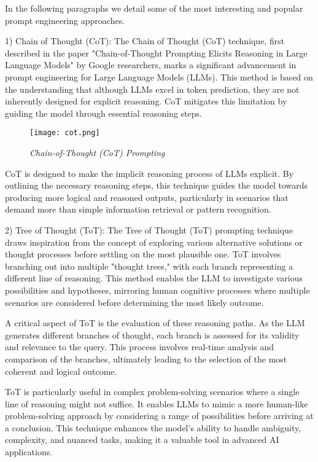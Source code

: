 In the following paragraphs we detail some of the most
interesting and popular prompt engineering approaches.

\hfill

1) Chain of Thought (CoT): The Chain of Thought (CoT) technique, first described in the paper "Chain-of-Thought Prompting Elicits Reasoning in Large Language Models" \cite{wei2023chainofthought} by Google researchers, marks a significant advancement in prompt engineering for Large Language Models (LLMs). This method is based on the understanding that although LLMs excel in token prediction, they are not inherently designed for explicit reasoning. CoT mitigates this limitation by guiding the model through essential reasoning steps.

\begin{figure}[H]
    \centering
    \texttt{[image: cot.png]}
    \caption{
        \it{Chain-of-Thought (CoT) Prompting \cite{wei2023chainofthought}}
    }
\end{figure}

CoT is designed to make the implicit reasoning process of LLMs explicit. By outlining the necessary reasoning steps, this technique guides the model towards producing more logical and reasoned outputs, particularly in scenarios that demand more than simple information retrieval or pattern recognition.

\hfill

2) Tree of Thought (ToT): The Tree of Thought (ToT) prompting technique \cite{yao2023tree} draws inspiration from the concept of exploring various alternative solutions or thought processes before settling on the most plausible one. ToT involves branching out into multiple "thought trees," with each branch representing a different line of reasoning. This method enables the LLM to investigate various possibilities and hypotheses, mirroring human cognitive processes where multiple scenarios are considered before determining the most likely outcome.


A critical aspect of ToT is the evaluation of these reasoning paths. As the LLM generates different branches of thought, each branch is assessed for its validity and relevance to the query. This process involves real-time analysis and comparison of the branches, ultimately leading to the selection of the most coherent and logical outcome.

ToT is particularly useful in complex problem-solving scenarios where a single line of reasoning might not suffice. It enables LLMs to mimic a more human-like problem-solving approach by considering a range of possibilities before arriving at a conclusion. This technique enhances the model's ability to handle ambiguity, complexity, and nuanced tasks, making it a valuable tool in advanced AI applications.

